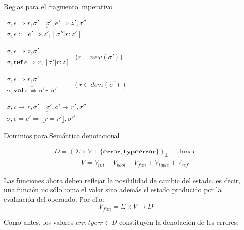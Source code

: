 \documentclass{beamer}
\newcommand{\s}{\sigma }
\begin{document}
\begin{frame}{Reglas para el fragmento imperativo}


\bigskip

$\begin{array}{c}
\underline{\s, e \Rightarrow r,\s'\quad \s',e' \Rightarrow z',\s''}\\
\s, e:=e' \Rightarrow z',[\s''|r:z']
\end{array}
$
\pause
\bigskip

\medskip$\begin{array}{c}
\s, e \Rightarrow z,\s'\\
\overline{\s,\textbf{ref}\ e\Rightarrow r,[\s'|r:z]}
\end{array}
$
\qquad ($r=new(\s')$)

\pause
\bigskip

\medskip$\begin{array}{c}
\s,e \Rightarrow r,\s'\\
\overline{\s,\textbf{val}\ e \Rightarrow \s' r,\s'}
\end{array}
\qquad (r\in dom(\s'))
$

\pause
\bigskip

\medskip$\begin{array}{c}
\underline{\s,e \Rightarrow r,\s'\quad \s',e' \Rightarrow r',\s''}\\
\s,e=e' \Rightarrow \lfloor r=r'\rfloor,\s''
\end{array}
$

\end{frame}


\begin{frame}{Dominios para Semántica denotacional}


  \begin{gather*}
D = ( \Sigma \times V + \{\textbf{error}, \textbf{typeerror}\})_\perp \quad\text{ donde } \\
\qquad \qquad V = V_{int} + V_{bool} + V_{fun}  + V_{tuple} + V_{\mathit{ref}} 
\end{gather*}

\medskip
\noindent Las funciones ahora deben reflejar la posibilidad de cambio
del estado, es decir, una función no sólo toma el valor sino además
el estado producido por la evaluación del operando. Por ello:
\[ V_{fun} = \Sigma \times V \rightarrow D \]

\pause

\medskip
Como antes, los valores $err,tyerr\in D$  constituyen la denotación de los errores. 

\end{frame}
\end{document}
